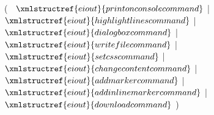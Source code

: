 ( 
$~$ $\xmlstructref{eiout}{printonconsolecommand}$ 
| $\xmlstructref{eiout}{highlightlinescommand}$ 
| $\xmlstructref{eiout}{dialogboxcommand}$ 
| $\xmlstructref{eiout}{writefilecommand}$ 
| $\xmlstructref{eiout}{setcsscommand}$
| $\xmlstructref{eiout}{changecontentcommand}$
| $\xmlstructref{eiout}{addmarkercommand}$
| $\xmlstructref{eiout}{addinlinemarkercommand}$
| $\xmlstructref{eiout}{downloadcommand}$
)
